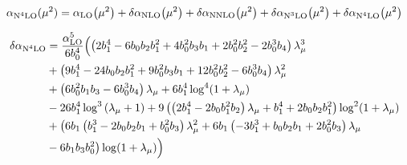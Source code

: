 \documentclass[../main.tex]{subfiles}
\begin{document}
\begin{equation}\label{eq:N4LO}
    \alpha_{\text{N}^4\text{LO}}(\mu^2) = \alpha_{\text{LO}}\qty(\mu^2) + \delta\alpha_{\text{NLO}}\qty(\mu^2)+\delta\alpha_{\text{NNLO}}\qty(\mu^2)+\delta\alpha_{\text{N}^3\text{LO}}\qty(\mu^2) + \delta\alpha_{\text{N}^4\text{LO}}\qty(\mu^2)
\end{equation}

\begin{equation}\label{eq:DN4LO}
    \begin{split}
        \delta\alpha_{\text{N}^4\text{LO}} &= \frac{\alpha_{\text{LO}}^5}{6 b_0^4} \Bigl( \left(2 b_1^4-6 b_0 b_2 b_1^2+4 b_0^2 b_3 b_1 + 2 b_0^2 b_2^2-2 b_0^3 b_4 \right) \lambda _{\mu}^3 \\
        &+ \left( 9 b_1^4-24 b_0 b_2 b_1^2+9 b_0^2 b_3 b_1+12 b_0^2 b_2^2-6 b_0^3 b_4\right) \lambda_{\mu}^2 \\
        &+ \left(6 b_0^2 b_1 b_3-6 b_0^3 b_4\right) \lambda_{\mu} + 6 b_1^4 \log ^4(1+ \lambda_{\mu})\\
        &- 26 b_1^4 \log ^3\left(\lambda _{\mu }+1\right)+9 \left(\left(2 b_1^4-2 b_0 b_1^2 b_2\right) \lambda _{\mu } + b_1^4+2 b_0 b_2 b_1^2\right) \log ^2(1+\lambda _{\mu})\\
        &+ \bigl(6 b_1 \left(b_1^3-2 b_0 b_2 b_1+b_0^2 b_3\right) \lambda _{\mu }^2
        + 6 b_1 \left(-3 b_1^3+b_0 b_2 b_1+2 b_0^2 b_3\right) \lambda_{\mu}\\
        &- 6 b_1 b_3 b_0^2 \bigr) \log(1+\lambda _{\mu }) \Bigr)
    \end{split}
\end{equation}
\end{document}
